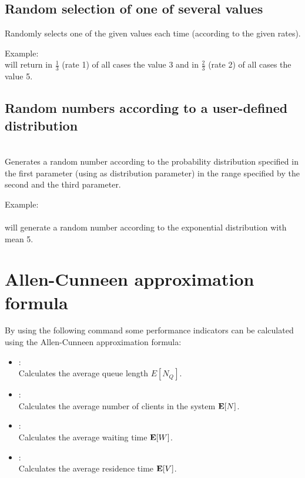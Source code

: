 \section{Random selection of one of several values}

Randomly selects one of the given values each time (according to the given rates).

Example:
\\
will return in $\frac{1}{3}$ (rate 1) of all cases the value 3 and in $\frac{2}{3}$ (rate 2) of all cases the value 5.



\section{Random numbers according to a user-defined distribution}

\\
Generates a random number according to the probability distribution specified in the first parameter (using  as distribution parameter) in the range specified by the second and the third parameter.

Example:\\
\\
will generate a random number according to the exponential distribution with mean 5.



\chapter{Allen-Cunneen approximation formula}

By using the following command some performance indicators can be calculated
using the Allen-Cunneen approximation formula:

\begin{itemize}

\item
{}:\\
Calculates the average queue length $E[N_Q]$. 

\item
{}:\\
Calculates the average number of clients in the system ${\bf E}[N]$.

\item
{}:\\
Calculates the average waiting time ${\bf E}[W]$.

\item
{}:\\
Calculates the average residence time ${\bf E}[V]$.
\end{itemize}

